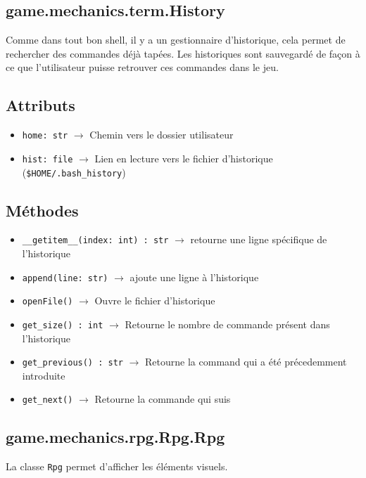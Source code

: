 \documentclass{report}
\begin{document}
\subsection{game.mechanics.term.History}
Comme dans tout bon shell, il y a un gestionnaire d’historique, cela permet de rechercher des commandes déjà tapées.
Les historiques sont sauvegardé de façon à ce que l'utilisateur puisse retrouver ces commandes dans le jeu.

\subsection*{Attributs}

\begin{itemize}
  \item \texttt{home: str}	$\rightarrow$ Chemin vers le dossier utilisateur
  \item \texttt{hist: file}		$\rightarrow$ Lien en lecture vers le fichier d’historique (\texttt{\$HOME/.bash_history}) %
\end{itemize}

\subsection*{Méthodes}
\begin{itemize}
\item \texttt{__getitem__(index: int) : str}	$\rightarrow$ retourne une ligne spécifique de l’historique
\item \texttt{append(line: str)}	$\rightarrow$  ajoute une ligne à l’historique
\item \texttt{openFile()}	$\rightarrow$ Ouvre le fichier d’historique
\item \texttt{get_size() : int}	$\rightarrow$ Retourne le nombre de commande présent dans l'historique
\item \texttt{get_previous() : str}	$\rightarrow$ Retourne la command qui a été précedemment introduite
\item \texttt{get_next()}	$\rightarrow$ Retourne la commande qui suis

\end{itemize}

\newpage

\subsection{game.mechanics.rpg.Rpg.Rpg}
La classe \texttt{Rpg} permet d’afficher les éléments visuels.
\end{document}
